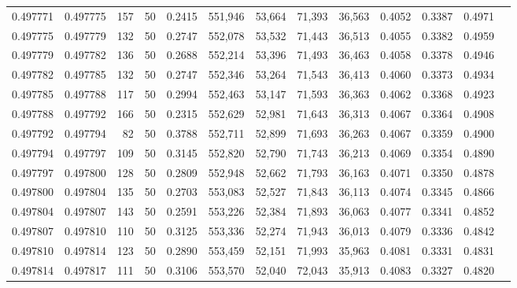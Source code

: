 \begin{tabular}{rrrrrrrrrrrrr}
0.497771 & 0.497775 &   157 &  50 &                                     0.2415 & 551,946 &  53,664 &  71,393 &  36,563 & 0.4052 & 0.3387 & 0.4971 \\
0.497775 & 0.497779 &   132 &  50 &                                     0.2747 & 552,078 &  53,532 &  71,443 &  36,513 & 0.4055 & 0.3382 & 0.4959 \\
0.497779 & 0.497782 &   136 &  50 &                                     0.2688 & 552,214 &  53,396 &  71,493 &  36,463 & 0.4058 & 0.3378 & 0.4946 \\
0.497782 & 0.497785 &   132 &  50 &                                     0.2747 & 552,346 &  53,264 &  71,543 &  36,413 & 0.4060 & 0.3373 & 0.4934 \\
0.497785 & 0.497788 &   117 &  50 &                                     0.2994 & 552,463 &  53,147 &  71,593 &  36,363 & 0.4062 & 0.3368 & 0.4923 \\
0.497788 & 0.497792 &   166 &  50 &                                     0.2315 & 552,629 &  52,981 &  71,643 &  36,313 & 0.4067 & 0.3364 & 0.4908 \\
0.497792 & 0.497794 &    82 &  50 &                                     0.3788 & 552,711 &  52,899 &  71,693 &  36,263 & 0.4067 & 0.3359 & 0.4900 \\
0.497794 & 0.497797 &   109 &  50 &                                     0.3145 & 552,820 &  52,790 &  71,743 &  36,213 & 0.4069 & 0.3354 & 0.4890 \\
0.497797 & 0.497800 &   128 &  50 &                                     0.2809 & 552,948 &  52,662 &  71,793 &  36,163 & 0.4071 & 0.3350 & 0.4878 \\
0.497800 & 0.497804 &   135 &  50 &                                     0.2703 & 553,083 &  52,527 &  71,843 &  36,113 & 0.4074 & 0.3345 & 0.4866 \\
0.497804 & 0.497807 &   143 &  50 &                                     0.2591 & 553,226 &  52,384 &  71,893 &  36,063 & 0.4077 & 0.3341 & 0.4852 \\
0.497807 & 0.497810 &   110 &  50 &                                     0.3125 & 553,336 &  52,274 &  71,943 &  36,013 & 0.4079 & 0.3336 & 0.4842 \\
0.497810 & 0.497814 &   123 &  50 &                                     0.2890 & 553,459 &  52,151 &  71,993 &  35,963 & 0.4081 & 0.3331 & 0.4831 \\
0.497814 & 0.497817 &   111 &  50 &                                     0.3106 & 553,570 &  52,040 &  72,043 &  35,913 & 0.4083 & 0.3327 & 0.4820 \\

\end{tabular}
